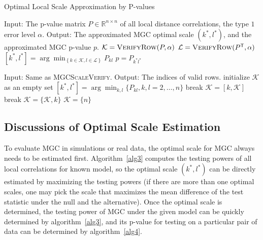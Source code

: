 \documentclass[11pt]{article}
\newcommand{\Real}{\mathbb{R}}
\newcommand{\K}{\mathcal{K}}
\newcommand{\LL}{\mathcal{L}}
\newcommand{\T}{^{\ensuremath{\mathsf{T}}}}           %
\begin{document}
\begin{algorithm}
\caption{Optimal Local Scale Approximation by P-values}
\label{alg5}
\begin{algorithmic}[1]
\Statex Input: The p-value matrix $P \in \Real^{n \times n}$ of all local distance correlations, the type $1$ error level $\alpha$.
\Statex Output: The approximated MGC optimal scale $(k^{*},l^{*})$, and the approximated MGC p-value $p$.
\State $\K=\textsc{VerifyRow}(P,\alpha)$ 
\State $\LL=\textsc{VerifyRow}(P\T,\alpha)$ 
\State $[k^{*},l^{*}]=\arg\min_{\left\{k \in \K, l \in \LL\right\}} P_{kl}$ 
\State $p=P_{k^{*}l^{*}}$
\EndFunction
\end{algorithmic}

\begin{algorithmic}[1]
\Statex
\Statex Input: Same as \textsc{MGCScaleVerify}.
\Statex Output: The indices of valid rows.
\State initialize $\K$ as an empty set
\State $[k^{*},l^{*}]=\arg\min_{k, l} \{P_{kl},k,l=2,\ldots,n\}$
 
\State break
\EndIf
\State $\K=[k,\K]$
\EndFor
{} 
\State break
\EndIf
\State $\K=\{\K,k\}$
\EndFor
\If{$\textsc{Median}(P_{kl},k \in \K, l=2,\ldots,n) > \alpha * \frac{|\K|}{n-1}$}
\State $\K=\{n\}$ 
\EndIf
\EndFunction
\end{algorithmic}
\end{algorithm}

\subsection{Discussions of Optimal Scale Estimation}
\label{appen:diss}
To evaluate MGC in simulations or real data, the optimal scale for MGC always needs to be estimated first. Algorithm~\ref{alg3} computes the testing powers of all local correlations for known model, so the optimal scale $(k^{*},l^{*})$ can be directly estimated by maximizing the testing powers (if there are more than one optimal scales, one may pick the scale that maximizes the mean difference of the test statistic under the null and the alternative). Once the optimal scale is determined, the testing power of MGC under the given model can be quickly determined by algorithm~\ref{alg3}, and its p-value for testing on a particular pair of data can be determined by algorithm~\ref{alg4}.
\end{document}
